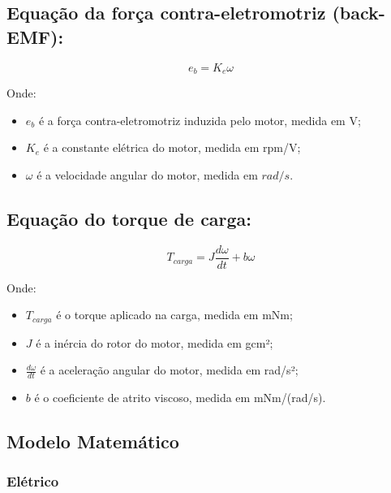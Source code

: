 \documentclass[a4paper, 12pt]{article}
\begin{document}
\subsection{Equação da força contra-eletromotriz (back-EMF):}

\begin{equation}
    e_{b} = K_e \omega   
\end{equation}


Onde:\\

\begin{itemize}
    \item $e_{b}$ é a força contra-eletromotriz induzida pelo motor, medida em V;
    \item $K_e$ é a constante elétrica do motor, medida em rpm/V;
    \item $\omega$ é a velocidade angular do motor, medida em $rad/s$.
\end{itemize}



\subsection{Equação do torque de carga:
}

\begin{equation}
    T_{carga} = J \frac{d\omega}{dt} + b \omega
\end{equation}

Onde:\\

\begin{itemize}
    \item $T_{carga}$ é o torque aplicado na carga, medida em mNm;
    \item $J$ é a inércia do rotor do motor, medida em gcm²;
    \item $\frac{d\omega}{dt}$ é a aceleração angular do motor, medida em rad/s²;
    \item $b$ é o coeficiente de atrito viscoso, medida em mNm/(rad/s).
\end{itemize}



\subsection{Modelo Matemático}
\subsubsection{Elétrico}
\end{document}
